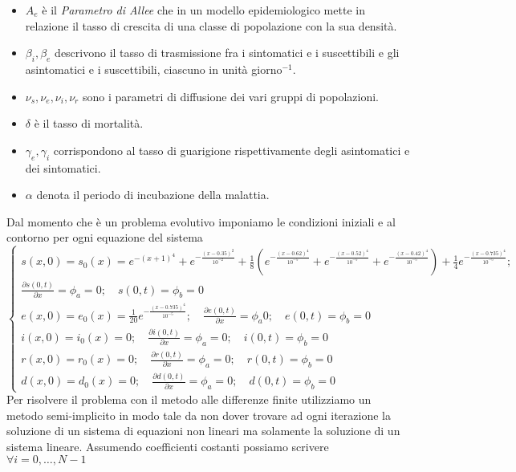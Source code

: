 \documentclass[11pt]{article}
\begin{document}
\begin{itemize}
\item \(A_e\) è il \textit{Parametro di Allee} che in un modello epidemiologico mette in relazione il tasso di crescita di una classe di popolazione con la sua densità.
\item \( \beta_i, \beta_e \) descrivono il tasso di trasmissione fra i sintomatici e i suscettibili e gli asintomatici e i suscettibili, ciascuno in unità giorno\(^{-1}\).  
\item \( \nu_s, \nu_e, \nu_i, \nu_r \) sono i parametri di diffusione dei vari gruppi di popolazioni.
\item \( \delta \) è il tasso di mortalità.
\item \(  \gamma_e, \gamma_i \) corrispondono al tasso di guarigione rispettivamente degli asintomatici e dei sintomatici.  
\item \( \alpha \) denota il periodo di incubazione della malattia. 
\end{itemize}
Dal momento che è un problema evolutivo imponiamo  le condizioni iniziali e al contorno per ogni equazione del sistema 
\begin{equation*}
\begin{cases}
s(x,0)=s_0(x)= e^{-(x+1)^4}+e^{- \frac{(x-0.35)^2}{10^{-2}}} + \frac18 \left( e^{- \frac{(x-0.62)^4}{10^{-5}}} + e^{- \frac{(x-0.52)^4}{10^{-5}}} + e^{- \frac{(x-0.42)^4}{10^{-5}}} \right) + \frac{1}{4}e^{- \frac{(x-0.735)^4}{10^{-5}}};  \\
\frac{ \partial s(0,t)}{\partial x} = \phi_a= 0 ; \quad s(0,t)=\phi_b=0 \\
e(x,0)=e_0(x)= \frac{1}{20}e^{- \frac{(x-0.735)^4}{10^{-5}}}; \quad \frac{ \partial e(0,t)}{\partial x} = \phi_a 0 ; \quad e(0,t)=\phi_b=0 \\
i(x,0)=i_0(x)= 0; \quad \frac{ \partial i(0,t)}{\partial x} = \phi_a= 0 ; \quad i(0,t)=\phi_b=0 \\
r(x,0)=r_0(x)= 0; \quad \frac{ \partial r(0,t)}{\partial x} = \phi_a=0 ; \quad r(0,t)=\phi_b=0 \\
d(x,0)=d_0(x)=0; \quad \frac{ \partial d(0,t)}{\partial x} = \phi_a =0 ; \quad d(0,t)=\phi_b=0
\end{cases}
\end{equation*}
Per risolvere il problema con il metodo alle differenze finite utilizziamo un metodo semi-implicito in modo tale da non dover trovare ad ogni iterazione la soluzione di un sistema di equazioni non lineari ma solamente la soluzione di un sistema lineare. Assumendo coefficienti costanti possiamo scrivere  \( \forall i=0, \dots , N-1 \) 
\end{document}
